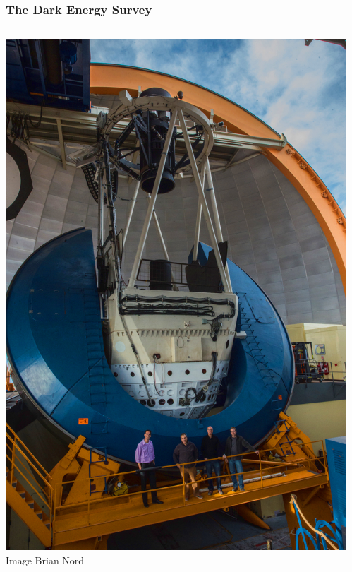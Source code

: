 \documentclass[aspectratio=169]{beamer}
\begin{document}
%
\frame
{

    \frametitle{The Dark Energy Survey}


    \begin{columns}
        \begin{column}{0.5\textwidth}
            \centering
                \includegraphics[height=0.8\textheight]{ctio_blanco_crew_2013Oct-30-small-balance.jpg}
                \newline
                {\tiny Image Brian Nord}
        \end{column}

        \begin{column}{0.5\textwidth}
            \begin{itemize}


\end{itemize}
\end{column}
\end{columns}}
\end{document}
